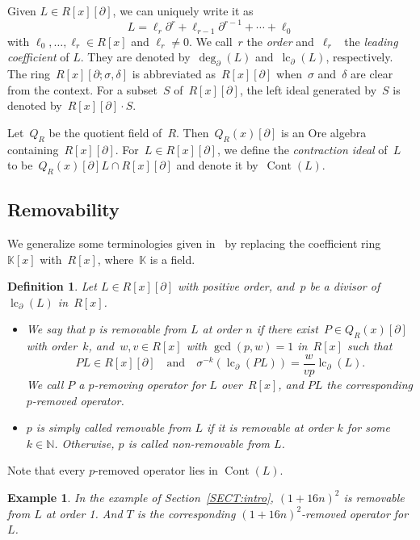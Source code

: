 \documentclass{sig-alternate}
\newcommand{\bN} { {\mathbb{N}}}
\newcommand{\cont}{\operatorname{Cont}}
\newcommand{\lc}{\operatorname{lc}}
\newcommand{\pa}{\partial}
\newtheorem{definition}[theorem]{Definition}
\newtheorem{example}[theorem]{Example}
\begin{document}
Given $L \in R[x][\pa]$, we can uniquely write it as
\[
 L = \ell_r \pa^r + \ell_{r-1} \pa^{r-1} + \cdots + \ell_0
\]
with $\ell_0, \ldots, \ell_r \in R[x]$ and $\ell_r \neq 0$.
We call~$r$  the \emph{order} and~$\ell_r$ ~the \emph{leading coefficient} of $L$.
They are denoted by~$\deg_{\pa}(L)$ and~$\lc_{\pa}(L)$, respectively.
The ring~$R[x][\pa; \sigma, \delta]$ is abbreviated as~$R[x][\pa]$ when~$\sigma$ and~$\delta$ are clear from the context. For a subset~$S$ of~$R[x][\pa]$, the left ideal generated by~$S$ is denoted by~$R[x][\pa]\cdot S$.

Let~$Q_R$ be the quotient field of~$R$. Then~$Q_{R}(x)[\pa]$ is an Ore algebra containing~$R[x][\pa]$.
For~$L \in R[x][\pa]$,
we define the \emph{contraction ideal} of~$L$ to be~$Q_{R}(x)[\pa] L \cap R[x][\pa]$ and denote it by~$\cont(L)$.
\subsection{Removability} \label{SUBSECT:remove}
We generalize some terminologies given in~\cite{Chen2013, Chen2016} by replacing the coefficient ring~$\mathbb{K}[x]$ with~$R[x]$, where~$\mathbb{K}$ is a field.


\begin{definition}\label{DEF:premovable}
Let $L \in R[x][\pa]$ with positive order, and~$p$ be a divisor of~$\lc_{\pa}(L)$ in~$R[x]$.
\begin{itemize}
 \item[(i)] We say that $p$ is \emph{removable} from $L$ at
order $n$ if there exist~$P \in Q_{R}(x)[\pa]$ with order~$k$, and~$w, v \in R[x]$
with $\gcd(p, w) = 1$ in~$R[x]$ such that
$$PL \in R[x][\pa] \quad \text{and} \quad \sigma^{-k}(\lc_{\pa}(PL)) = \frac{w}{vp}\lc_{\pa}(L).$$
We call $P$ a \emph{$p$-removing operator for $L$ over~$R[x]$}, and $PL$ the corresponding \emph{$p$-removed operator}.
\item[(ii)] $p$ is simply called \emph{removable} from $L$ if it is removable at order $k$ for some $k \in \bN$. Otherwise,
$p$ is called \emph{non-removable} from $L$.
\end{itemize}
\end{definition}
Note that every $p$-removed operator lies in $\cont(L)$.

\begin{example}
In the example of Section~\ref{SECT:intro}, $(1 + 16n)^2$ is removable from $L$ at order 1.
And $T$ is the corresponding $(1 + 16n)^2$-removed operator for $L$.
\end{example}
\end{document}
